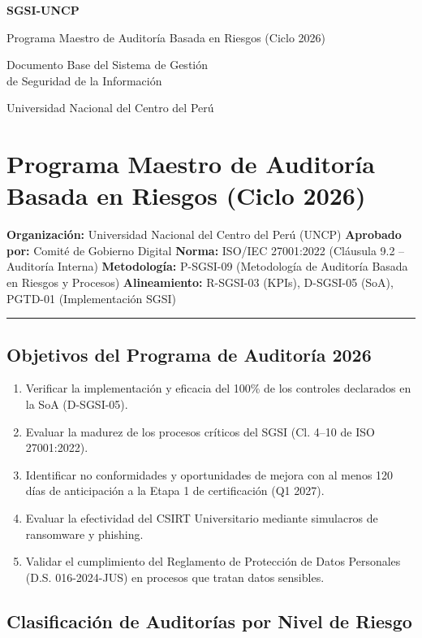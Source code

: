 \documentclass[10pt,letterpaper]{article}
\newcommand{\makecover}{
\begin{titlepage}
\centering
\vspace*{2cm}
{\Huge\bfseries\color{uncpblue} SGSI-UNCP\par}
\vspace{0.7cm}
{\LARGE Programa Maestro de Auditoría Basada en Riesgos (Ciclo
2026)\par}
\vspace{0.5cm}
{\large Documento Base del Sistema de Gestión\\de Seguridad de la Información\par}
\vspace{1.5cm}
{\small Universidad Nacional del Centro del Perú\par}
\vfill
\end{titlepage}
}
\begin{document}
\makecover
\setcounter{tocdepth}{2}
\RaggedRight
\tableofcontents
\newpage

\RaggedRight
\section{Programa Maestro de Auditoría Basada en Riesgos (Ciclo
2026)}\label{programa-maestro-de-auditoruxeda-basada-en-riesgos-ciclo-2026}

\textbf{Organización:} Universidad Nacional del Centro del Perú (UNCP)
\textbf{Aprobado por:} Comité de Gobierno Digital \textbf{Norma:}
ISO/IEC 27001:2022 (Cláusula 9.2 -- Auditoría Interna)
\textbf{Metodología:} P-SGSI-09 (Metodología de Auditoría Basada en
Riesgos y Procesos) \textbf{Alineamiento:} R-SGSI-03 (KPIs), D-SGSI-05
(SoA), PGTD-01 (Implementación SGSI)

\begin{center}\rule{0.5\linewidth}{0.5pt}\end{center}

\subsection{Objetivos del Programa de Auditoría
2026}\label{objetivos-del-programa-de-auditoruxeda-2026}

\begin{enumerate}
\def\labelenumi{\arabic{enumi}.}
\tightlist
\item
  Verificar la implementación y eficacia del 100\% de los controles
  declarados en la SoA (D-SGSI-05).
\item
  Evaluar la madurez de los procesos críticos del SGSI (Cl. 4--10 de ISO
  27001:2022).
\item
  Identificar no conformidades y oportunidades de mejora con al menos
  120 días de anticipación a la Etapa 1 de certificación (Q1 2027).
\item
  Evaluar la efectividad del CSIRT Universitario mediante simulacros de
  ransomware y phishing.
\item
  Validar el cumplimiento del Reglamento de Protección de Datos
  Personales (D.S. 016-2024-JUS) en procesos que tratan datos sensibles.
\end{enumerate}

\subsection{Clasificación de Auditorías por Nivel de
Riesgo}\label{clasificaciuxf3n-de-auditoruxedas-por-nivel-de-riesgo}
\end{document}
